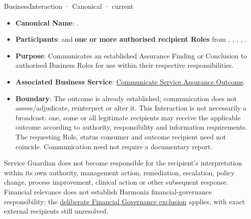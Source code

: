 \label{element:73b6d1ab8ecc48c4bdea98f013288c9c}
{\small BusinessInteraction · Canonical · current}\par

\begin{itemize}


\item \textbf{Canonical Name}: \texttt{}.

\item \textbf{Participants}: \texttt{} and \textbf{one or more authorised recipient Roles} from \texttt{}, \texttt{}, \texttt{}, \texttt{}, \texttt{}.

\item \textbf{Purpose}: Communicates an established Assurance Finding or Conclusion to authorised Business Roles for use within their respective responsibilities.

\item \textbf{Associated Business Service}: \href{\detokenize{../../../../../../../../../docs/markdown/03-business-architecture/behaviours/health-service-assurance.md#communicate-service-assurance-outcome}}{Communicate Service Assurance Outcome}.

\item \textbf{Boundary}: The outcome is already established; communication does not assess/adjudicate, reinterpret or alter it. This Interaction is not necessarily a broadcast: one, some or all legitimate recipients may receive the applicable outcome according to authority, responsibility and information requirements. The requesting Role, status consumer and outcome recipient need not coincide. Communication need not require a documentary report.

\end{itemize}


Service Guardian does not become responsible for the recipient's interpretation within its own authority, management action, remediation, escalation, policy change, process improvement, clinical action or other subsequent response. Financial relevance does not establish Harmonia financial-governance responsibility; the \href{\detokenize{../../../../../../../../../docs/markdown/03-business-architecture/behaviours/health-service-assurance.md#financial-governance-exclusion}}{deliberate Financial Governance exclusion} applies, with exact external recipients still unresolved.


